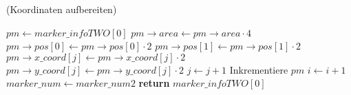 \begin{algorithm}[ht]
\caption{ (Koordinaten aufbereiten)}
\label{alg:detectmarker2-6}
\begin{algorithmic}[1]
	\State $\mathit{pm} \gets \mathit{marker\_infoTWO}[0]$
	\label{alg:detectmarker2-6-address}
	\label{alg:detectmarker2-6-loop-start}
		\State $\mathit{pm \to area} \gets \mathit{pm \to area} \cdot 4$
		\label{alg:detectmarker2-6-area}
		\State $\mathit{pm \to pos}[0] \gets \mathit{pm \to pos}[0] \cdot 2$
		\State $\mathit{pm \to pos}[1] \gets \mathit{pm \to pos}[1] \cdot 2$
		\label{alg:detectmarker2-6-pos}
		\label{alg:detectmarker2-6-coord-start}
			\State $\mathit{pm \to x\_coord}[j] \gets \mathit{pm \to x\_coord}[j] \cdot 2$
			\State $\mathit{pm \to y\_coord}[j] \gets \mathit{pm \to y\_coord}[j] \cdot 2$
			\State $j \gets j + 1$
		\EndFor
		\label{alg:detectmarker2-6-coord-end}
		\State Inkrementiere $\mathit{pm}$
		\label{alg:detectmarker2-6-incpm}
		\State $i \gets i + 1$
	\EndFor
	\label{alg:detectmarker2-6-loop-end}
	\State $\mathit{marker\_num} \gets \mathit{marker\_num2}$
	\State \textbf{return} $\mathit{marker\_infoTWO}[0]$
\end{algorithmic}
\end{algorithm}
